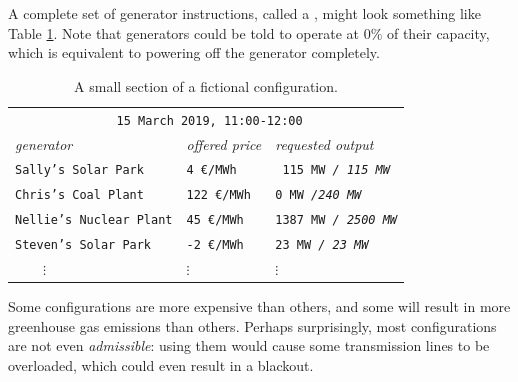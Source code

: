 \documentclass[main.tex]{subfiles}
\begin{document}
A complete set of generator instructions, called a , might look something like Table \ref{tab:sampleconfiguration}. Note that generators could be told to operate at 0\% of their capacity, which is equivalent to powering off the generator completely.

\begin{table}[t]
    \centering
\begin{tabular}{l@{\hskip 2em}l@{\hskip 2em}l}
\toprule
    \multicolumn{3}{c}{\texttt{%
    15 March 2019, 11:00-12:00}}\\[.5em]
    \emph{generator} & \emph{offered price} & \emph{requested output} \\
\midrule
    \texttt{Sally's Solar Park} & \texttt{\hphantom{xx}4 \euro/MWh}  & \texttt{ 115 MW \emph{/ \hphantom{x}115 MW}} \\
    \texttt{Chris's Coal Plant} & \texttt{122 \euro/MWh}  & \texttt{\hphantom{xxx}0 MW \emph{/\hphantom{xx}240 MW}} \\
    \texttt{Nellie's Nuclear Plant} & \texttt{\hphantom{x}45 \euro/MWh}  & \texttt{1387 MW \emph{/ 2500 MW}} \\
    \texttt{Steven's Solar Park} & \texttt{\hphantom{x}-2 \euro/MWh}  & \texttt{\hphantom{xx}23 MW \emph{/ \hphantom{xx}23 MW}} \\
    $\qquad\vdots$ & \texttt{\hphantom{xx}}$\vdots$  & \texttt{\hphantom{xxx}}$\vdots$ \\
\bottomrule
\end{tabular}
    \caption{A small section of a fictional configuration.}
    \label{tab:sampleconfiguration}
\end{table}


Some configurations are more expensive than others, and some will result in more greenhouse gas emissions than others. Perhaps surprisingly, most configurations are not even \emph{admissible}: using them would cause some transmission lines to be overloaded, which could even result in a blackout.
\end{document}

